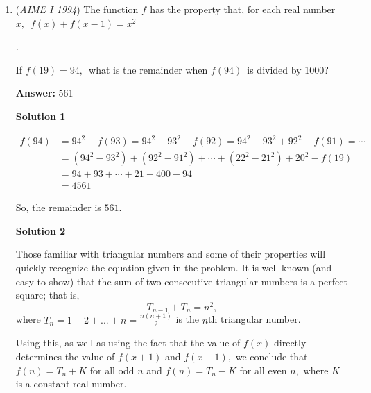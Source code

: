 \begin{enumerate}
 Apply the \href{https://artofproblemsolving.com/wiki/index.php?title=Pythagorean\_Theorem}{Pythagorean Theorem}: 

 
            \begin{enumerate}[label=(\roman*)]
                \item $(AB - 10)^2 + \left(\frac 12 AB\right)^2 = 20^2$\item $AB^2 - 20 AB + 100 + \frac 14 AB^2 - 400 = 0$\item $AB^2 - 16 AB - 240 = 0$
            \end{enumerate}
            The \href{https://artofproblemsolving.com/wiki/index.php?title=Quadratic\_formula}{quadratic formula} shows that the answer is $\frac{16 \pm \sqrt{16^2 + 4 \cdot 240}}{2} = 8 \pm \sqrt{304}$. Discard the negative root, so our answer is $8 + 304 = \boxed{312}$.

 


	\item (\textit{AIME I 1994}) The function $f_{}^{}$ has the property that, for each real number $x,\,$
$f(x)+f(x-1) = x^2\,$

 .


 If $f(19)=94,\,$ what is the remainder when $f(94)\,$ is divided by 1000?


 
 \textbf{Answer: }561



\textbf{Solution 1}


 \begin{align*}f(94)&=94^2-f(93)=94^2-93^2+f(92)=94^2-93^2+92^2-f(91)=\cdots \\ &= (94^2-93^2) + (92^2-91^2) +\cdots+ (22^2-21^2)+ 20^2-f(19) \\ &= 94+93+\cdots+21+400-94  \\ &= 4561 \end{align*}


 So, the remainder is $\boxed{561}$.

 



\textbf{Solution 2}

Those familiar with triangular numbers and some of their properties will quickly recognize the equation given in the problem. It is well-known (and easy to show) that the sum of two consecutive triangular numbers is a perfect square; that is,
 \[T_{n-1} + T_n = n^2,\]where $T_n = 1+2+...+n = \frac{n(n+1)}{2}$ is the $n$th triangular number.

 Using this, as well as using the fact that the value of $f(x)$ directly determines the value of $f(x+1)$ and $f(x-1),$ we conclude that $f(n) = T_n + K$ for all odd $n$ and $f(n) = T_n - K$ for all even $n,$ where $K$ is a constant real number.


\end{enumerate}
